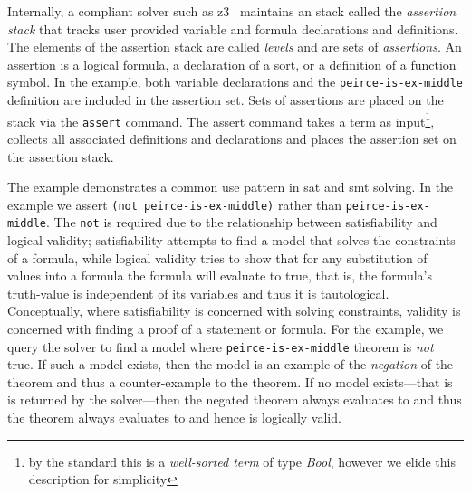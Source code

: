 Internally, a compliant solver such as z3~\cite{10.1007/978-3-540-78800-3_24}
maintains an stack called the \emph{assertion stack} that tracks user provided
variable and formula declarations and definitions. The elements of the assertion
stack are called \emph{levels} and are sets of \emph{assertions}.
%
An assertion is a logical formula, a declaration of a sort, or a definition of a
function symbol. In the example, both variable declarations and the
\lstinline{peirce-is-ex-middle} definition are included in the assertion set.
Sets of assertions are placed on the stack via the \lstinline{assert} command.
The assert command takes a term as input\footnote{by the standard this is a
  \emph{well-sorted term} of type \emph{Bool}, however we elide this description
  for simplicity}, collects all associated definitions and declarations and
places the assertion set on the assertion stack.

The example demonstrates a common use pattern in \ac{sat} and \ac{smt} solving.
In the example we assert \lstinline{(not peirce-is-ex-middle)} rather than
\lstinline{peirce-is-ex-middle}. The \lstinline{not} is required due to the
relationship between satisfiability and logical validity; satisfiability
attempts to find a model that solves the constraints of a formula, while logical
validity tries to show that for any substitution of values into a formula the
formula will evaluate to true, that is, the formula's truth-value is independent
of its variables and thus it is tautological. Conceptually, where satisfiability
is concerned with solving constraints, validity is concerned with finding a
proof of a statement or formula. For the example, we query the solver to find a
model where \lstinline{peirce-is-ex-middle} theorem is \emph{not} true. If such
a model exists, then the model is an example of the \emph{negation} of the
theorem and thus a counter-example to the theorem. If no model exists---that is
 is returned by the solver---then the negated theorem always evaluates
to \fls{} and thus the theorem always evaluates to \tru{} and hence is logically
valid.

%

